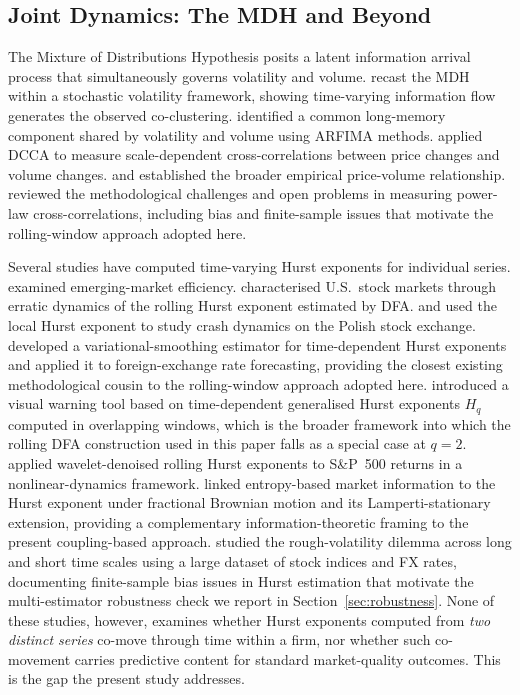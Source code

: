 \documentclass[preprint,12pt,authoryear]{elsarticle}
\begin{document}
\subsection{Joint Dynamics: The MDH and Beyond}

The Mixture of Distributions Hypothesis \citep{clark1973subordinated, tauchen1983price, epps1976stochastic} posits a latent information arrival process that simultaneously governs volatility and volume. \citet{andersen1996return} recast the MDH within a stochastic volatility framework, showing time-varying information flow generates the observed co-clustering. \citet{bollerslev1999equity} identified a common long-memory component shared by volatility and volume using ARFIMA methods. \citet{podobnik2009cross} applied DCCA to measure scale-dependent cross-correlations between price changes and volume changes. \citet{karpoff1987relation} and \citet{gallant1992stock} established the broader empirical price-volume relationship. \citet{kristoufek2015power} reviewed the methodological challenges and open problems in measuring power-law cross-correlations, including bias and finite-sample issues that motivate the rolling-window approach adopted here.

Several studies have computed time-varying Hurst exponents for individual series. \citet{cajueiro2004hurst} examined emerging-market efficiency. \citet{alvarez2008time} characterised U.S.\ stock markets through erratic dynamics of the rolling Hurst exponent estimated by DFA. \citet{grech2004crash} and \citet{grech2008local} used the local Hurst exponent to study crash dynamics on the Polish stock exchange. \citet{garcin2017estimation} developed a variational-smoothing estimator for time-dependent Hurst exponents and applied it to foreign-exchange rate forecasting, providing the closest existing methodological cousin to the rolling-window approach adopted here. \citet{antoniades2021scaling} introduced a visual warning tool based on time-dependent generalised Hurst exponents $H_q$ computed in overlapping windows, which is the broader framework into which the rolling DFA construction used in this paper falls as a special case at $q = 2$. \citet{vogl2023hurst} applied wavelet-denoised rolling Hurst exponents to S\&P~500 returns in a nonlinear-dynamics framework. \citet{brouty2024fractal} linked entropy-based market information to the Hurst exponent under fractional Brownian motion and its Lamperti-stationary extension, providing a complementary information-theoretic framing to the present coupling-based approach. \citet{garcin2022long} studied the rough-volatility dilemma across long and short time scales using a large dataset of stock indices and FX rates, documenting finite-sample bias issues in Hurst estimation that motivate the multi-estimator robustness check we report in Section~\ref{sec:robustness}. None of these studies, however, examines whether Hurst exponents computed from \emph{two distinct series} co-move through time within a firm, nor whether such co-movement carries predictive content for standard market-quality outcomes. This is the gap the present study addresses.
\end{document}
